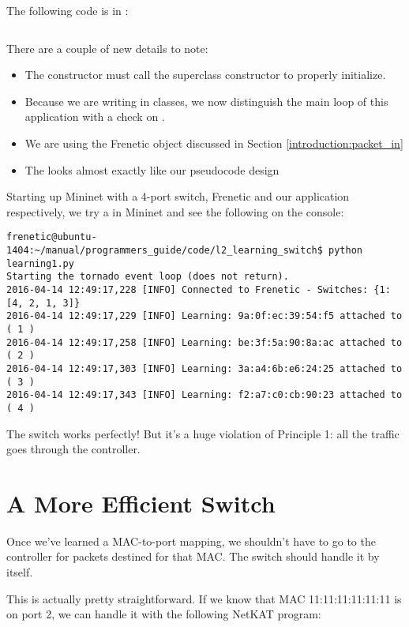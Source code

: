 The following code is in :

\inputminted[linenos]{python}{code/l2_learning_switch/learning1.py}

There are a couple of new details to note:

\begin{itemize}
\item The  constructor must call the superclass constructor 
 to properly initialize.
\item Because we are writing in classes, we now distinguish the main loop of this application with 
a check on .  
\item We are using the Frenetic  object discussed in Section \ref{introduction:packet_in}
\item The  looks almost exactly like our pseudocode design
\end{itemize}

Starting up Mininet with a 4-port switch, Frenetic and our application respectively, 
we try a  in Mininet and see
the following on the console:

\begin{verbatim}
frenetic@ubuntu-1404:~/manual/programmers_guide/code/l2_learning_switch$ python learning1.py
Starting the tornado event loop (does not return).
2016-04-14 12:49:17,228 [INFO] Connected to Frenetic - Switches: {1: [4, 2, 1, 3]}
2016-04-14 12:49:17,229 [INFO] Learning: 9a:0f:ec:39:54:f5 attached to ( 1 )
2016-04-14 12:49:17,258 [INFO] Learning: be:3f:5a:90:8a:ac attached to ( 2 )
2016-04-14 12:49:17,303 [INFO] Learning: 3a:a4:6b:e6:24:25 attached to ( 3 )
2016-04-14 12:49:17,343 [INFO] Learning: f2:a7:c0:cb:90:23 attached to ( 4 )
\end{verbatim}

The switch works perfectly!  But it's a huge violation of Principle 1: all the traffic 
goes through the controller.  

\section{A More Efficient Switch}

Once we've learned a MAC-to-port
mapping, we shouldn't have to go to the controller for packets destined for that MAC.  The switch
should handle it by itself.

This is actually pretty straightforward.  If we know that MAC 11:11:11:11:11:11 is on port 2, we
can handle it with the following NetKAT program:

